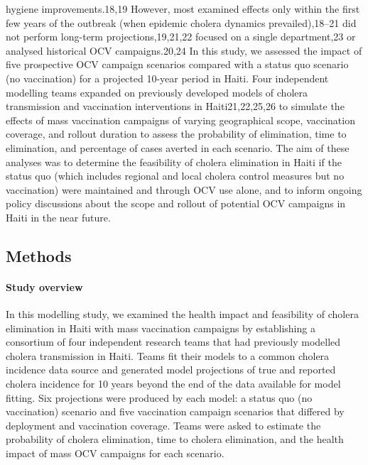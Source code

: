 hygiene improvements.18,19 However, most examined effects only within the first few years of the outbreak (when epidemic cholera dynamics prevailed),18–21 did not perform long-term projections,19,21,22 focused on a single department,23 or analysed historical OCV campaigns.20,24 In this study, we assessed the impact of five prospective OCV campaign scenarios compared with a status quo scenario (no vaccination) for a projected 10-year period in Haiti. Four independent modelling teams expanded on previously developed models of cholera transmission and vaccination interventions in Haiti21,22,25,26 to simulate the effects of mass vaccination campaigns of varying geographical scope, vaccination coverage, and rollout duration to assess the probability of elimination, time to elimination, and percentage of cases averted in each scenario. The aim of these analyses was to determine the feasibility of cholera elimination in Haiti if the status quo (which includes regional and local cholera control measures but no vaccination) were maintained and through OCV use alone, and to inform ongoing policy discussions about the scope and rollout of potential OCV campaigns in Haiti in the near future.
 
 \subsection{Methods}
  \paragraph{Study overview} In this modelling study, we examined the health impact and feasibility of cholera elimination in Haiti with mass vaccination campaigns by establishing a consortium of four independent research teams that had previously modelled cholera transmission in Haiti. Teams fit their models to a common cholera incidence data source and generated model projections of true and reported cholera incidence for 10 years beyond the end of the data available for model fitting. Six projections were produced by each model: a status quo (no vaccination) scenario and five vaccination campaign scenarios that differed by deployment and vaccination coverage. Teams were asked to estimate the probability of cholera elimination, time to cholera elimination, and the health impact of mass OCV campaigns for each scenario. 
  
